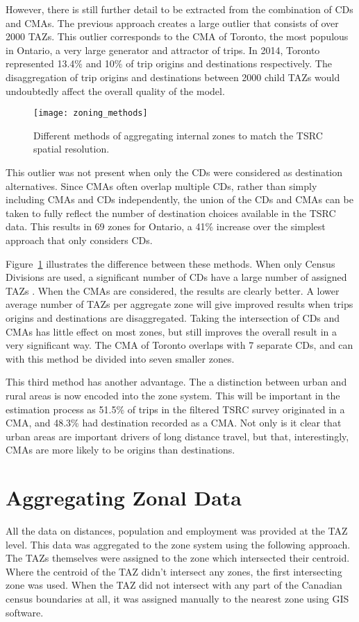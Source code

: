 However, there is still further detail to be extracted from the combination of CDs and CMAs. The previous approach creates a large outlier that consists of over 2000 TAZs. This outlier corresponds to the CMA of Toronto, the most populous in Ontario, a very large generator and attractor of trips. In 2014, Toronto represented 13.4\% and 10\% of trip origins and destinations respectively. The disaggregation of trip origins and destinations between 2000 child TAZs would undoubtedly affect the overall quality of the model. 

\begin{figure}[H]
\centering
\texttt{[image: zoning\_methods]}
\caption{Different methods of aggregating internal zones to match the TSRC spatial resolution.}
\label{fig:zoning}
\end{figure}

This outlier was not present when only the CDs were considered as destination alternatives. Since CMAs often overlap multiple CDs, rather than simply including CMAs and CDs independently, the union of the CDs and CMAs can be taken to fully reflect the number of destination choices available in the TSRC data. This results in 69 zones for Ontario, a 41\% increase over the simplest approach that only considers CDs.

Figure~\ref{fig:zoning} illustrates the difference between these methods. When only Census Divisions are used, a significant number of CDs have a large number of assigned TAZs . When the CMAs are considered, the results are clearly better. A lower average number of TAZs per aggregate zone will give improved results when trips origins and destinations are disaggregated. Taking the intersection of CDs and CMAs has little effect on most zones, but still improves the overall result in a very significant way. The CMA of Toronto overlaps with 7 separate CDs, and can with this method be divided into seven smaller zones.

This third method has another advantage. The a distinction between urban and rural areas is now encoded into the zone system. This will be important in the estimation process as 51.5\% of trips in the filtered TSRC survey originated in a CMA, and 48.3\% had destination recorded as a CMA. Not only is it clear that urban areas are important drivers of long distance travel, but that, interestingly, CMAs are more likely to be origins than destinations.

\section{Aggregating Zonal Data}
All the data on distances, population and employment was provided at the TAZ level. This data was aggregated to the zone system using the following approach. The TAZs themselves were assigned to the zone which intersected their centroid. Where the centroid of the TAZ didn't intersect any zones, the first intersecting zone was used. When the TAZ did not intersect with any part of the Canadian census boundaries at all, it was assigned manually to the nearest zone using GIS software.

